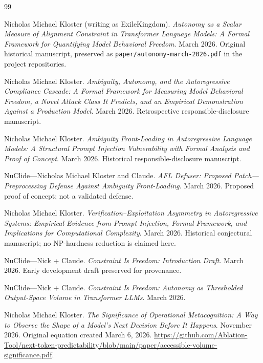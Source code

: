 \clearpage
\begin{thebibliography}{99}

Nicholas Michael Kloster (writing as ExileKingdom).
\newblock \emph{Autonomy as a Scalar Measure of Alignment Constraint in Transformer Language Models: A Formal Framework for Quantifying Model Behavioral Freedom}.
\newblock March 2026. Original historical manuscript, preserved as \texttt{paper/autonomy-march-2026.pdf} in the project repositories.

Nicholas Michael Kloster.
\newblock \emph{Ambiguity, Autonomy, and the Autoregressive Compliance Cascade: A Formal Framework for Measuring Model Behavioral Freedom, a Novel Attack Class It Predicts, and an Empirical Demonstration Against a Production Model}.
\newblock March 2026. Retrospective responsible-disclosure manuscript.

Nicholas Michael Kloster.
\newblock \emph{Ambiguity Front-Loading in Autoregressive Language Models: A Structural Prompt Injection Vulnerability with Formal Analysis and Proof of Concept}.
\newblock March 2026. Historical responsible-disclosure manuscript.

NuClide---Nicholas Michael Kloster and Claude.
\newblock \emph{AFL Defuser: Proposed Patch---Preprocessing Defense Against Ambiguity Front-Loading}.
\newblock March 2026. Proposed proof of concept; not a validated defense.

Nicholas Michael Kloster.
\newblock \emph{Verification--Exploitation Asymmetry in Autoregressive Systems: Empirical Evidence from Prompt Injection, Formal Framework, and Implications for Computational Complexity}.
\newblock March 2026. Historical conjectural manuscript; no NP-hardness reduction is claimed here.

NuClide---Nick + Claude.
\newblock \emph{Constraint Is Freedom: Introduction Draft}.
\newblock March 2026. Early development draft preserved for provenance.

NuClide---Nick + Claude.
\newblock \emph{Constraint Is Freedom: Autonomy as Thresholded Output-Space Volume in Transformer LLMs}.
\newblock March 2026.

Nicholas Michael Kloster.
\newblock \emph{The Significance of Operational Metacognition: A Way to Observe the Shape of a Model's Next Decision Before It Happens}.
\newblock November 2026. Original equation created March 6, 2026.
\newblock \url{https://github.com/Ablation-Tool/next-token-predictability/blob/main/paper/accessible-volume-significance.pdf}.


\end{thebibliography}
